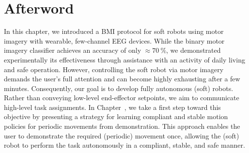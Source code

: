 \section*{Afterword}
In this chapter, we introduced a \gls{BMI} protocol for soft robots using motor imagery with wearable, few-channel \gls{EEG} devices. While the binary motor imagery classifier achieves an accuracy of only $\approx \SI{70}{\percent}$, we demonstrated experimentally its effectiveness through assistance with an activity of daily living and safe operation. However, controlling the soft robot via motor imagery demands the user’s full attention and can become highly exhausting after a few minutes. Consequently, our goal is to develop fully autonomous (soft) robots. Rather than conveying low-level end-effector setpoints, we aim to communicate high-level task assignments. In Chapter~\circled{\ref{chp:osmp}}, we take a first step toward this objective by presenting a strategy for learning compliant and stable motion policies for periodic movements from demonstration. This approach enables the user to demonstrate the required (periodic) movement once, allowing the (soft) robot to perform the task autonomously in a compliant, stable, and safe manner.
